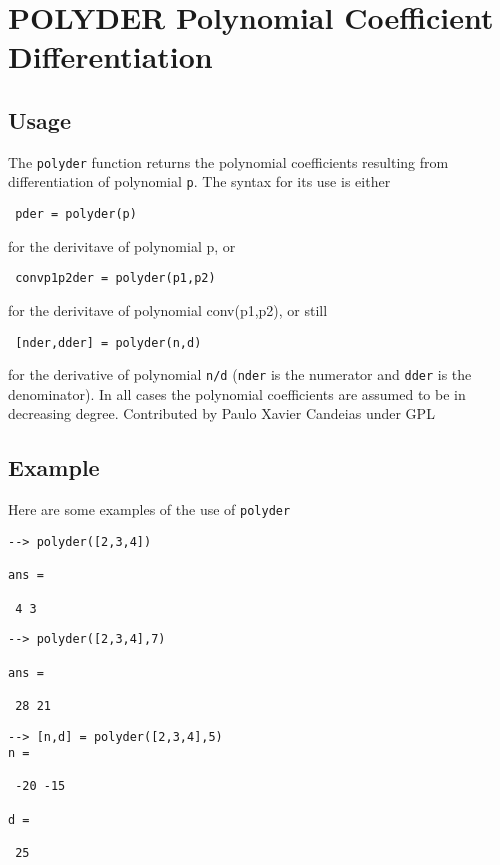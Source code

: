 \section{POLYDER Polynomial Coefficient Differentiation}

\subsection{Usage}

The \verb|polyder| function returns the polynomial coefficients resulting
from differentiation of polynomial \verb|p|. The syntax for its use is either
\begin{verbatim}
 pder = polyder(p)
\end{verbatim}
 for the derivitave of polynomial p, or
\begin{verbatim}
 convp1p2der = polyder(p1,p2)
\end{verbatim}
 for the derivitave of polynomial conv(p1,p2), or still
\begin{verbatim}
 [nder,dder] = polyder(n,d)
\end{verbatim}
for the derivative of polynomial \verb|n/d| (\verb|nder| is the numerator
and \verb|dder| is the denominator). In all cases the polynomial 
coefficients are assumed to be in decreasing degree.
Contributed by Paulo Xavier Candeias under GPL
\subsection{Example}

Here are some examples of the use of \verb|polyder|
\begin{verbatim}
--> polyder([2,3,4])

ans = 

 4 3 
\end{verbatim}
\begin{verbatim}
--> polyder([2,3,4],7)

ans = 

 28 21 
\end{verbatim}
\begin{verbatim}
--> [n,d] = polyder([2,3,4],5)
n = 

 -20 -15 

d = 

 25 
\end{verbatim}
